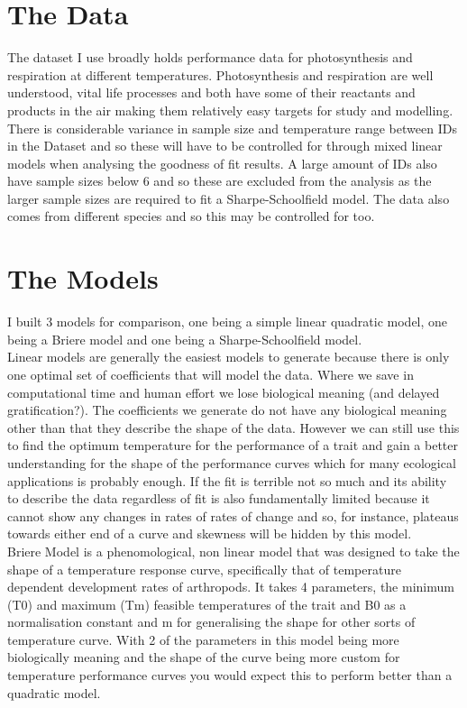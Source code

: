 \documentclass[12pt]{article}
\begin{document}
  \section{The Data}
  The dataset I use broadly holds performance data for photosynthesis and respiration at different temperatures. Photosynthesis and respiration are well understood, vital life processes and both have some of their reactants and products in the air making them relatively easy targets for study and modelling. There is considerable variance in sample size and temperature range between IDs in the Dataset and so these will have to be controlled for through mixed linear models when analysing the goodness of fit results. A large amount of IDs also have sample sizes below 6 and so these are excluded from the analysis as the larger sample sizes are required to fit a Sharpe-Schoolfield model. The data also comes from different species and so this may be controlled for too.\\
 
  \section{The Models}
  I built 3 models for comparison, one being a simple linear quadratic model, one being a Briere model and one being a Sharpe-Schoolfield model.\\
  Linear models are generally the easiest models to generate because there is only one optimal set of coefficients that will model the data. Where we save in computational time and human effort we lose biological meaning (and delayed gratification?). The coefficients we generate do not have any biological meaning other than that they describe the shape of the data. However we can still use this to find the optimum temperature for the performance of a trait and gain a better understanding for the shape of the performance curves which for many ecological applications is probably enough. If the fit is terrible not so much and its ability to describe the data regardless of fit is also fundamentally limited because it cannot show any changes in rates of rates of change and so, for instance, plateaus towards either end of a curve and skewness will be hidden by this model.\\
  Briere Model \cite{Brierea} is a phenomological, non linear model that was designed to take the shape of a temperature response curve, specifically that of temperature dependent development rates of arthropods. It takes 4 parameters, the minimum (T0) and maximum (Tm) feasible temperatures of the trait and B0 as a normalisation constant and m for generalising the shape for other sorts of temperature curve. With 2 of the parameters in this model being more biologically meaning and the shape of the curve being more custom for temperature performance curves you would expect this to perform better than a quadratic model.\\
\end{document}
